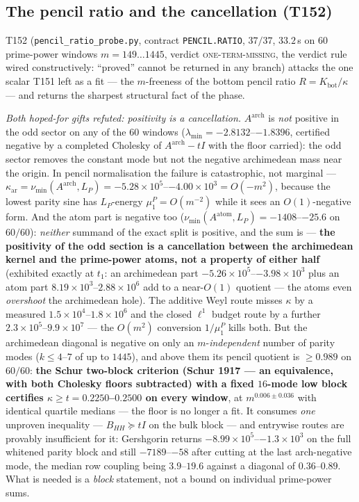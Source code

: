 \documentclass[11pt,a4paper]{article}
\begin{document}
\subsection{The pencil ratio and the cancellation (T152)}
T152 (\texttt{pencil\_ratio\_probe.py}, contract \texttt{PENCIL.RATIO}, $37/37$, $33.2$\,s on
$60$ prime-power windows $m=149\ldots1445$, verdict \textsc{one-term-missing}, the verdict
rule wired constructively: ``proved'' cannot be returned in any branch) attacks the one
scalar T151 left as a fit --- the $m$-freeness of the bottom pencil ratio
$R=K_{\mathrm{bot}}/\kappa$ --- and returns the sharpest structural fact of the phase.

\emph{Both hoped-for gifts refuted: positivity is a cancellation.} $A^{\mathrm{arch}}$ is
\emph{not} positive in the odd sector on any of the $60$ windows
($\lambda_{\min}=-2.8132$--$-1.8396$, certified negative by a completed Cholesky of
$A^{\mathrm{arch}}-tI$ with the floor carried): the odd sector removes the constant mode but
not the negative archimedean mass near the origin. In pencil normalisation the failure is
catastrophic, not marginal --- $\kappa_{\mathrm{ar}}=\nu_{\min}(A^{\mathrm{arch}},L_P)
=-5.28\times10^{5}$--$-4.00\times10^{3}=O(-m^{2})$, because the lowest parity sine has
$L_P$-energy $\mu^P_1=O(m^{-2})$ while it sees an $O(1)$-negative form. And the atom part is
negative too ($\nu_{\min}(A^{\mathrm{atom}},L_P)=-1408$--$-25.6$ on $60/60$): \emph{neither}
summand of the exact split is positive, and the sum is --- \textbf{the positivity of the odd
section is a cancellation between the archimedean kernel and the prime-power atoms, not a
property of either half} (exhibited exactly at $t_1$: an archimedean part
$-5.26\times10^{5}$--$-3.98\times10^{3}$ plus an atom part
$8.19\times10^{3}$--$2.88\times10^{6}$ add to a near-$O(1)$ quotient --- the atoms even
\emph{overshoot} the archimedean hole). The additive Weyl route misses $\kappa$ by a measured
$1.5\times10^{4}$--$1.8\times10^{6}$ and the closed $\ell^1$ budget route by a further
$2.3\times10^{5}$--$9.9\times10^{7}$ --- the $O(m^{2})$ conversion $1/\mu^P_1$ kills both.
But the archimedean diagonal is negative on only an $m$-\emph{independent} number of parity
modes ($k\le4$--$7$ of up to $1445$), and above them its pencil quotient is $\ge0.989$ on
$60/60$: \textbf{the Schur two-block criterion (Schur 1917 --- an equivalence, with both
Cholesky floors subtracted) with a fixed $16$-mode low block certifies
$\kappa\ge t=0.2250$--$0.2500$ on every window}, at $m^{0.006\pm0.036}$ with identical
quartile medians --- the floor is no longer a fit. It consumes \emph{one} unproven
inequality --- $B_{HH}\succeq tI$ on the bulk block --- and entrywise routes are provably
insufficient for it: Gershgorin returns $-8.99\times10^{5}$--$-1.3\times10^{3}$ on the full
whitened parity block and still $-7189$--$-58$ after cutting at the last arch-negative mode,
the median row coupling being $3.9$--$19.6$ against a diagonal of $0.36$--$0.89$. What is
needed is a \emph{block} statement, not a bound on individual prime-power sums.
\end{document}
